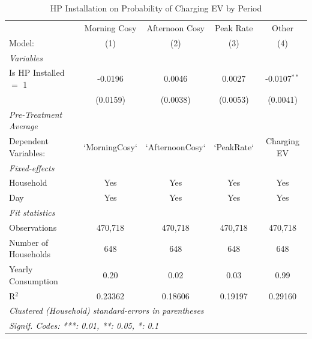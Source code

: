 
\begin{table}[htbp]
   \caption{\label{tab:hp-ev-charging} HP Installation on Probability of Charging EV by Period}
   \centering
   \begin{tabular}{lcccc}
      \tabularnewline \midrule \midrule
                                     & Morning Cosy  & Afternoon Cosy  & Peak Rate  & Other \\   
      Model:                         & (1)           & (2)             & (3)        & (4)\\  
      \midrule
      \emph{Variables}\\
      Is HP Installed $=$ 1          & -0.0196       & 0.0046          & 0.0027     & -0.0107$^{**}$\\   
                                     & (0.0159)      & (0.0038)        & (0.0053)   & (0.0041)\\   
      \midrule
\emph{Pre-Treatment Average}\\
      Dependent Variables:           & `MorningCosy` & `AfternoonCosy` & `PeakRate` & Charging EV\\  
\midrule
      \emph{Fixed-effects}\\
      Household                      & Yes           & Yes             & Yes        & Yes\\  
      Day                            & Yes           & Yes             & Yes        & Yes\\  
      \midrule
      \emph{Fit statistics}\\
      Observations                   & 470,718       & 470,718         & 470,718    & 470,718\\  
      Number of Households & 648           & 648             & 648        & 648\\  
      Yearly Consumption             & 0.20          & 0.02            & 0.03       & 0.99\\  
      R$^2$                          & 0.23362       & 0.18606         & 0.19197    & 0.29160\\  
      \midrule \midrule
      \multicolumn{5}{l}{\emph{Clustered (Household) standard-errors in parentheses}}\\
      \multicolumn{5}{l}{\emph{Signif. Codes: ***: 0.01, **: 0.05, *: 0.1}}\\
   \end{tabular}
\end{table}


